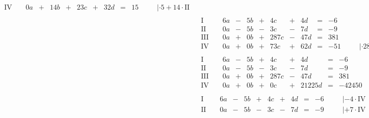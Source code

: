 \begin{exercise}
\begin{minipage}[t]{0.49\linewidth}
\begin{align*}
\begin{array}{r|rrrrrrrrrrrl}
         \text{IV}{\,} & {\,} & \num{0}a & + & \num{14}b & + & \num{23}c & + & \num{32}d & = & \num{15} & {\quad} & |\cdot\num{5}+\num{14}\cdot\text{II}
        \end{array}
        \\[1ex]&
        \begin{array}{r|rrrrrrrrrrrl}
          \text{I}{\,} & {\,} & \num{6}a & - & \num{5}b & + &   \num{4}c & + &  \num{4}d & = &  -\num{6} & {\quad} &                                         \\
         \text{II}{\,} & {\,} & \num{0}a & - & \num{5}b & - &   \num{3}c & - &  \num{7}d & = &  -\num{9} & {\quad} &                                         \\
        \text{III}{\,} & {\,} & \num{0}a & + & \num{0}b & + & \num{287}c & - & \num{47}d & = & \num{381} & {\quad} &                                         \\
         \text{IV}{\,} & {\,} & \num{0}a & + & \num{0}b & + &  \num{73}c & + & \num{62}d & = & -\num{51} & {\quad} & |\cdot\num{287}-\num{73}\cdot\text{III}
        \end{array}
        \\[1ex]&
        \begin{array}{r|rrrrrrrrrrrl}
          \text{I}{\,} & {\,} & \num{6}a & - & \num{5}b & + &   \num{4}c & + &     \num{4}d & = &     -\num{6} & {\quad} &               \\
         \text{II}{\,} & {\,} & \num{0}a & - & \num{5}b & - &   \num{3}c & - &     \num{7}d & = &     -\num{9} & {\quad} &               \\
        \text{III}{\,} & {\,} & \num{0}a & + & \num{0}b & + & \num{287}c & - &    \num{47}d & = &    \num{381} & {\quad} &               \\
         \text{IV}{\,} & {\,} & \num{0}a & + & \num{0}b & + &   \num{0}c & + & \num{21225}d & = & -\num{42450} & {\quad} & |:\num{21225}
        \end{array}
        \\[1ex]&
        \begin{array}{r|rrrrrrrrrrrl}
          \text{I}{\,} & {\,} & \num{6}a & - & \num{5}b & + &   \num{4}c & + &  \num{4}d & = &  -\num{6} & {\quad} & |-\num{4}\cdot\text{IV}  \\
         \text{II}{\,} & {\,} & \num{0}a & - & \num{5}b & - &   \num{3}c & - &  \num{7}d & = &  -\num{9} & {\quad} & |+\num{7}\cdot\text{IV}  \\

\end{array}
\end{align*}
\end{minipage}
\end{exercise}
